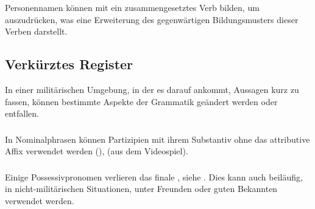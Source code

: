 \subsubsection{}Personennamen können mit  ein zusammengesetztes Verb bilden, um  auszudrücken, was eine Erweiterung des gegenwärtigen Bildungsmusters dieser Verben darstellt.

\subsection{Verkürztes Register} In einer militärischen Umgebung, in der es darauf ankommt, Aussagen kurz zu fassen, können bestimmte Aspekte der Grammatik geändert werden oder entfallen.

\subsubsection{} In Nominalphrasen können Partizipien mit ihrem Substantiv ohne das attributive Affix  verwendet werden (),   (aus dem Videospiel).

\subsubsection{} Einige Possessivpronomen verlieren das finale , siehe . Dies kann auch beiläufig, in nicht-militärischen Situationen, unter Freunden oder guten Bekannten verwendet werden.
